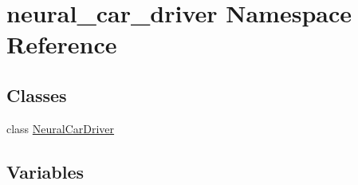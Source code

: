 \hypertarget{namespaceneural__car__driver}{}\section{neural\+\_\+car\+\_\+driver Namespace Reference}
\label{namespaceneural__car__driver}
\subsection*{Classes}
\begin{DoxyCompactItemize}
\item 
class \hyperlink{classneural__car__driver_1_1_neural_car_driver}{Neural\+Car\+Driver}
\end{DoxyCompactItemize}
\subsection*{Variables}
